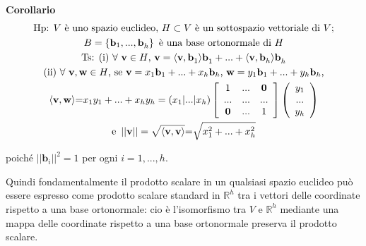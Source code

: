 \documentclass{article}
\begin{document}
\textbf{Corollario}%
\begin{gather*}
\text{Hp}\text{: }V\text{ \`{e} uno spazio euclideo, }H\subset V\text{ \`{e}
un sottospazio vettoriale di }V\text{;} \\
B=\left\{ \mathbf{b}_{1}\mathbf{,...,b}_{h}\right\} \text{ \`{e} una base
ortonormale di }H \\
\text{Ts}\text{: (i) }\forall \text{ }\mathbf{v}\in H\text{, }\mathbf{v}%
=\langle \mathbf{v,b}_{1}\mathbf{\rangle b}_{1}+...+\langle \mathbf{v,b}_{h}%
\mathbf{\rangle b}_{h} \\
\text{(ii) }\forall \text{ }\mathbf{v,w}\in H\text{, se }\mathbf{v}=x_{1}%
\mathbf{b}_{1}+...+x_{h}\mathbf{b}_{h}\text{, }\mathbf{w}=y_{1}\mathbf{b}%
_{1}+...+y_{h}\mathbf{b}_{h}\text{,} \\
\langle \mathbf{v,w\rangle }\mathbf{=}x_{1}y_{1}+...+x_{h}y_{h}=\left(
x_{1}|...|x_{h}\right) \left[ 
\begin{array}{ccc}
1 & \mathbf{...} & \mathbf{0} \\ 
\mathbf{...} & \mathbf{...} & \mathbf{...} \\ 
\mathbf{0} & \mathbf{...} & 1%
\end{array}%
\right] \left( 
\begin{array}{c}
y_{1} \\ 
... \\ 
y_{h}%
\end{array}%
\right) \\
\text{e }\left\vert \left\vert \mathbf{v}\right\vert \right\vert =\sqrt{%
\langle \mathbf{v,v\rangle }}\mathbf{=}\sqrt{x_{1}^{2}+...+x_{h}^{2}}
\end{gather*}

poich\'{e} $\left\vert \left\vert \mathbf{b}_{i}\right\vert \right\vert
^{2}=1$ per ogni $i=1,...,h$.

Quindi fondamentalmente il prodotto scalare in un qualsiasi spazio euclideo
pu\`{o} essere espresso come prodotto scalare standard in $%
\mathbb{R}
^{h}$ tra i vettori delle coordinate rispetto a una base ortonormale: cio%
\`{e} l'isomorfismo tra $V$ e $%
\mathbb{R}
^{h}$ mediante una mappa delle coordinate rispetto a una base ortonormale
preserva il prodotto scalare.
\end{document}
